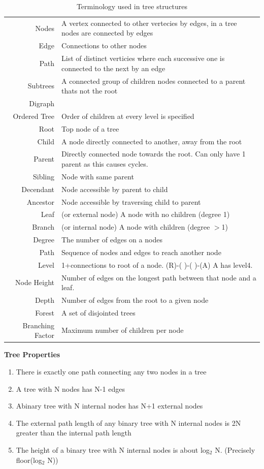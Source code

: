 \begin{table}
	\caption{Terminology used in tree structures}
	\begin{tabular}{r p{}}
		Nodes&A vertex connected to other vertecies by edges, in a tree nodes are connected by edges\\
		Edge&Connections to other nodes\\
		Path&List of distinct verticies where each successive one is connected to the next by an edge\\
		Subtrees&A connected group of children nodes connected to a parent thats not the root\\
		Digraph&\\
		Ordered Tree&Order of children at every level is specified\\
		Root& Top node of a tree\\
		Child&A node directly connected to another, away from the root\\
		Parent&Directly connected node towards the root. Can only have 1 parent as this causes cycles.\\
		Sibling&Node with same parent\\
		Decendant&Node accessible by parent to child\\
		Ancestor&Node accessible by traversing child to parent\\
		Leaf&(or external node) A node with no children (degree 1)\\
		Branch&(or internal node) A node with children (degree $>$1)\\
		Degree&The number of edges on a nodes\\
		Path&Sequence of nodes and edges to reach another node\\
		Level&1+connections to root of a node. (R)-( )-( )-(A) A has level4.\\
		Node Height&Number of edges on the longest path between that node and a leaf.\\
		Depth&Number of edges from the root to a given node\\
		Forest&A set of disjointed trees\\
		Branching Factor&Maximum number of children per node\\
	\end{tabular}
\end{table}

\textbf{Tree Properties}
\begin{enumerate}
	\item There is exactly one path connecting any two nodes in a tree
	\item A tree with N nodes has N-1 edges
	\item Abinary tree with N internal nodes has N+1 external nodes
	\item The external path length of any binary tree with N internal nodes is 2N greater than the internal path length
	\item The height of a binary tree with N internal nodes is about log$_2$ N. (Precisely floor(log$_2$ N))
\end{enumerate}

